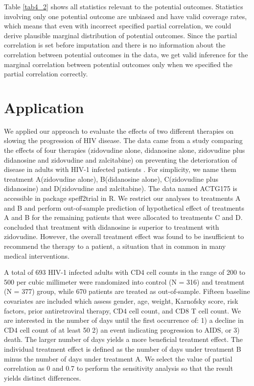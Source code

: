 	Table \ref{tab4_2} shows all statistics relevant to the potential outcomes. Statistics involving only one potential outcome are unbiased and have valid coverage rates, which means that even with incorrect specified partial correlation, we could derive plausible marginal distribution of potential outcomes. Since the partial correlation is set before imputation and there is no information about the correlation between potential outcomes in the data, we get valid inference for the marginal correlation between potential outcomes only when we specified the partial correlation correctly.  
	
	\section{Application}
	\label{sec:4.6}
	We applied our approach to evaluate the effects of two different therapies on slowing the progression of HIV disease. The data came from a study comparing the effects of four therapies (zidovudine alone, didanosine alone, zidovudine plus didanosine and zidovudine and zalcitabine) on preventing the deterioration of disease in adults with HIV-1 infected patients \citep{hammer1996trial}. For simplicity, we name them treatment A(zidovudine alone), B(didanosine alone), C(zidovudine plus didanosine) and D(zidovudine and zalcitabine). The data named ACTG175 is accessible in package speff2trial in R. We restrict our analyses to treatments A and B and perform out-of-sample prediction of hypothetical effect of treatments A and B for the remaining patients that were allocated to treatments C and D. \citet{hammer1996trial} concluded that treatment with didanosine is superior to treatment with zidovudine. However, the overall treatment effect was found to be insufficient to recommend the therapy to a patient, a situation that in common in many medical interventions. 
	
	A total of 693 HIV-1 infected adults with CD4 cell counts in the range of 200 to 500 per cubic millimeter were randomized into control (N = 316) and treatment (N = 377) group, while 670 patients are treated as out-of-sample. Fifteen baseline covariates are included which assess gender, age, weight, Karnofsky score, risk factors, prior antiretroviral therapy, CD4 cell count, and CD8 T cell count. We are interested in the number of days until the first occurrence of: 1) a decline in CD4 cell count of at least 50 2) an event indicating progression to AIDS, or 3) death. The larger number of days yields a more beneficial treatment effect. The individual treatment effect is defined as the number of days under treatment B minus the number of days under treatment A. We select the value of partial correlation as 0 and 0.7 to perform the sensitivity analysis so that the result yields distinct differences. 
	
